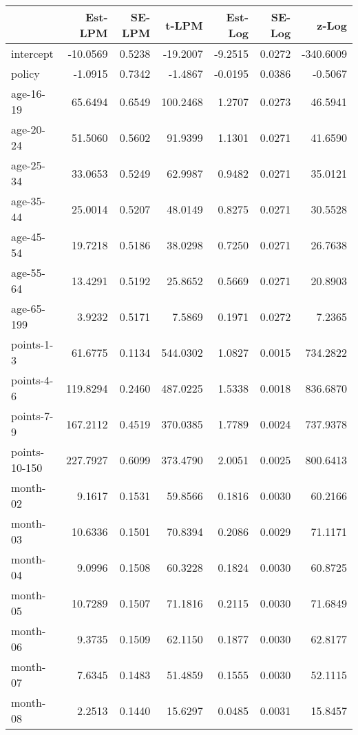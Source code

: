 \documentclass[10pt]{article}
\begin{document}
\begin{table}[ht]
\centering
\begin{tabular}{lrrrrrr}
  \hline
 & Est-LPM & SE-LPM & t-LPM & Est-Log & SE-Log & z-Log \\ 
  \hline
intercept & -10.0569 & 0.5238 & -19.2007 & -9.2515 & 0.0272 & -340.6009 \\ 
  policy & -1.0915 & 0.7342 & -1.4867 & -0.0195 & 0.0386 & -0.5067 \\ 
  age-16-19 & 65.6494 & 0.6549 & 100.2468 & 1.2707 & 0.0273 & 46.5941 \\ 
  age-20-24 & 51.5060 & 0.5602 & 91.9399 & 1.1301 & 0.0271 & 41.6590 \\ 
  age-25-34 & 33.0653 & 0.5249 & 62.9987 & 0.9482 & 0.0271 & 35.0121 \\ 
  age-35-44 & 25.0014 & 0.5207 & 48.0149 & 0.8275 & 0.0271 & 30.5528 \\ 
  age-45-54 & 19.7218 & 0.5186 & 38.0298 & 0.7250 & 0.0271 & 26.7638 \\ 
  age-55-64 & 13.4291 & 0.5192 & 25.8652 & 0.5669 & 0.0271 & 20.8903 \\ 
  age-65-199 & 3.9232 & 0.5171 & 7.5869 & 0.1971 & 0.0272 & 7.2365 \\ 
  points-1-3 & 61.6775 & 0.1134 & 544.0302 & 1.0827 & 0.0015 & 734.2822 \\ 
  points-4-6 & 119.8294 & 0.2460 & 487.0225 & 1.5338 & 0.0018 & 836.6870 \\ 
  points-7-9 & 167.2112 & 0.4519 & 370.0385 & 1.7789 & 0.0024 & 737.9378 \\ 
  points-10-150 & 227.7927 & 0.6099 & 373.4790 & 2.0051 & 0.0025 & 800.6413 \\ 
  month-02 & 9.1617 & 0.1531 & 59.8566 & 0.1816 & 0.0030 & 60.2166 \\ 
  month-03 & 10.6336 & 0.1501 & 70.8394 & 0.2086 & 0.0029 & 71.1171 \\ 
  month-04 & 9.0996 & 0.1508 & 60.3228 & 0.1824 & 0.0030 & 60.8725 \\ 
  month-05 & 10.7289 & 0.1507 & 71.1816 & 0.2115 & 0.0030 & 71.6849 \\ 
  month-06 & 9.3735 & 0.1509 & 62.1150 & 0.1877 & 0.0030 & 62.8177 \\ 
  month-07 & 7.6345 & 0.1483 & 51.4859 & 0.1555 & 0.0030 & 52.1115 \\ 
  month-08 & 2.2513 & 0.1440 & 15.6297 & 0.0485 & 0.0031 & 15.8457 \\ 

\end{tabular}
\end{table}
\end{document}
